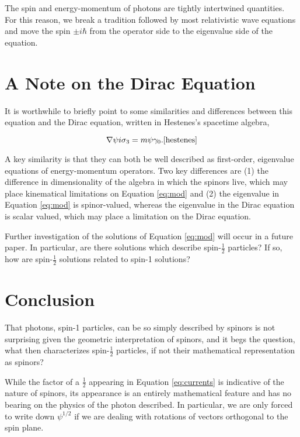 \documentclass{birkjour}
\begin{document}
The spin and energy-momentum of photons are tightly intertwined quantities. For this reason, we break a tradition followed by most relativistic wave equations and move the spin $\pm i \hbar$ from the operator side to the eigenvalue side of the equation.

\section{A Note on the Dirac Equation}

It is worthwhile to briefly point to some similarities and differences between this equation and the Dirac equation, written in Hestenes's spacetime algebra,

\begin{equation}
  \nabla \psi i \sigma_3 = m \psi \gamma_0. \text{\cite{hestenes}}
\end{equation}

A key similarity is that they can both be well described as first-order, eigenvalue equations of energy-momentum operators. Two key differences are (1) the difference in dimensionality of the algebra in which the spinors live, which may place kinematical limitations on Equation \ref{eq:mod} and (2) the eigenvalue in Equation \ref{eq:mod} is spinor-valued, whereas the eigenvalue in the Dirac equation is scalar valued, which may place a limitation on the Dirac equation.

Further investigation of the solutions of Equation \ref{eq:mod} will occur in a future paper. In particular, are there solutions which describe spin-$\frac{1}{2}$ particles? If so, how are spin-$\frac{1}{2}$ solutions related to spin-1 solutions?

\section{Conclusion}

That photons, spin-1 particles, can be so simply described by spinors is not surprising given the geometric interpretation of spinors, and it begs the question, what then characterizes spin-$\frac{1}{2}$ particles, if not their mathematical representation as spinors?

While the factor of a $\frac{1}{2}$ appearing in Equation \ref{eq:currents} is indicative of the nature of spinors, its appearance is an entirely mathematical feature and has no bearing on the physics of the photon described. In particular, we are only forced to write down $\psi^{1/2}$ if we are dealing with rotations of vectors orthogonal to the spin plane.
\end{document}
